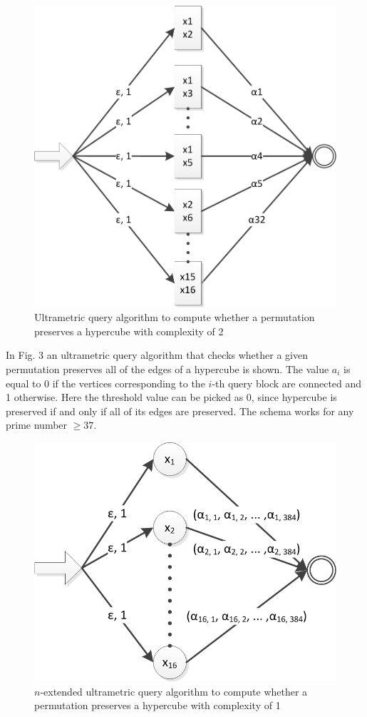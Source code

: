 \documentclass{llncs}
\begin{document}
\begin{figure}
	\centering
	\includegraphics{hypercube_2block.png}
	\caption{Ultrametric query algorithm to compute whether a permutation preserves a hypercube with complexity of 2}
	  \label{hyper2}
\end{figure}

In Fig. 3 an ultrametric query algorithm that checks whether a given permutation preserves all of the edges of a hypercube is shown. The value $a_i$ is equal to 0 if the vertices corresponding to the $i$-th query block are connected and 1 otherwise. Here the threshold value can be picked as 0, since hypercube is preserved if and only if all of its edges are preserved. The schema works for any prime number $\geq 37$.

\begin{figure}
	\centering
	\includegraphics{hypercube_1block.png}
	\caption{$n$-extended ultrametric query algorithm to compute whether a permutation preserves a hypercube with complexity of 1}
	  \label{hyper1}
\end{figure}
\end{document}
